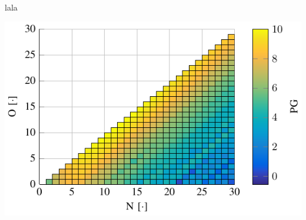 

\begin{centering}
	
	\begin{raggedright}
		lala
	\end{raggedright}

	\begin{raggedleft}
		\includegraphics{figures/HammingNOP10.pdf}
		\label{fig:HammingNOP10}
	\end{raggedleft}
	
	


\end{centering}





